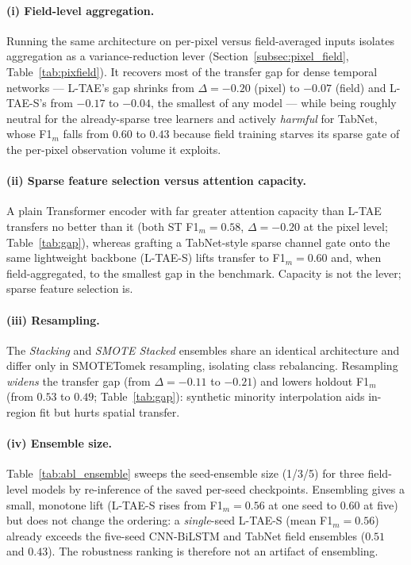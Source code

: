 \documentclass[pdflatex,sn-mathphys]{sn-jnl} %
\begin{document}
\paragraph{(i) Field-level aggregation.}
Running the same architecture on per-pixel versus field-averaged inputs isolates
aggregation as a variance-reduction lever (Section~\ref{subsec:pixel_field},
Table~\ref{tab:pixfield}). It recovers most of the transfer gap for dense temporal
networks --- L-TAE's gap shrinks from $\Delta=-0.20$ (pixel) to $-0.07$ (field)
and L-TAE-S's from $-0.17$ to $-0.04$, the smallest of any model --- while being
roughly neutral for the already-sparse tree learners and actively \emph{harmful}
for TabNet, whose F1$_m$ falls from $0.60$ to $0.43$ because field training
starves its sparse gate of the per-pixel observation volume it exploits.

\paragraph{(ii) Sparse feature selection versus attention capacity.}
A plain Transformer encoder with far greater attention capacity than L-TAE
transfers no better than it (both ST F1$_m=0.58$, $\Delta=-0.20$ at the pixel
level; Table~\ref{tab:gap}), whereas grafting a TabNet-style sparse channel gate
onto the same lightweight backbone (L-TAE-S) lifts transfer to F1$_m=0.60$ and,
when field-aggregated, to the smallest gap in the benchmark. Capacity is not the
lever; sparse feature selection is.

\paragraph{(iii) Resampling.}
The \emph{Stacking} and \emph{SMOTE Stacked} ensembles share an identical
architecture and differ only in SMOTETomek resampling, isolating class
rebalancing. Resampling
\emph{widens} the transfer gap (from $\Delta=-0.11$ to $-0.21$) and lowers holdout
F1$_m$ (from $0.53$ to $0.49$; Table~\ref{tab:gap}): synthetic minority
interpolation aids in-region fit but hurts spatial transfer.

\paragraph{(iv) Ensemble size.}
Table~\ref{tab:abl_ensemble} sweeps the seed-ensemble size (1/3/5) for three
field-level models by re-inference of the saved per-seed checkpoints. Ensembling
gives a small, monotone lift (L-TAE-S rises from F1$_m=0.56$ at one seed to $0.60$
at five) but does not change the ordering: a \emph{single}-seed L-TAE-S (mean
F1$_m=0.56$) already exceeds the five-seed CNN-BiLSTM and TabNet field ensembles
($0.51$ and $0.43$). The robustness ranking is therefore not an artifact of
ensembling.
\end{document}
